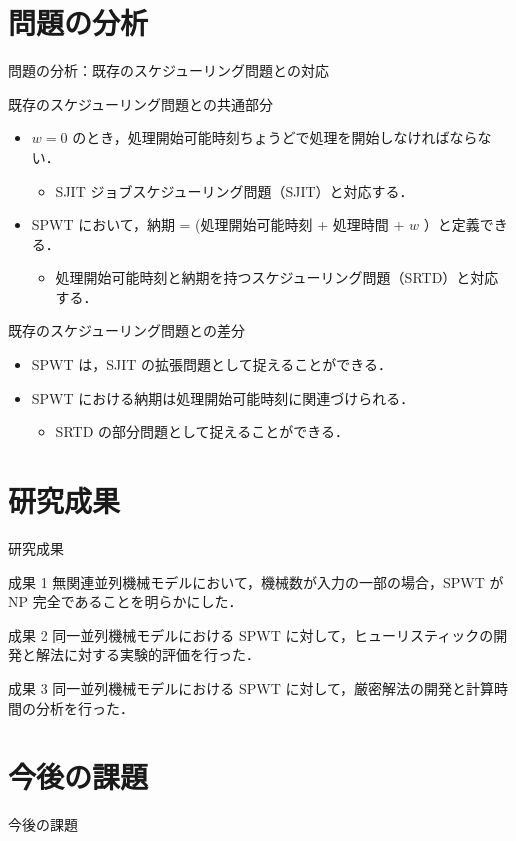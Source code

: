 \documentclass[dvipdfmx]{beamer}
\begin{document}
\section{問題の分析}
\begin{frame}{問題の分析：既存のスケジューリング問題との対応}
  \begin{block}{既存のスケジューリング問題との共通部分}
    \begin{itemize}
      \item {$w = 0$ のとき，処理開始可能時刻ちょうどで処理を開始しなければならない．}
      \begin{itemize}
        \item {\alert{SJIT ジョブスケジューリング問題（SJIT）}と対応する．}
      \end{itemize}
      \item {SPWT において，納期 = (処理開始可能時刻 + 処理時間 + $w$ ）と定義できる．}
      \begin{itemize}
        \item {\alert{処理開始可能時刻と納期を持つスケジューリング問題（SRTD）}と対応する．}
      \end{itemize}
    \end{itemize}
  \end{block}
  \begin{block}{既存のスケジューリング問題との差分}
    \begin{itemize}
      \item {SPWT は，SJIT の\alert{拡張問題}として捉えることができる．}
      \item {SPWT における納期は処理開始可能時刻に関連づけられる．}
      \begin{itemize}
        \item {SRTD の\alert{部分問題}として捉えることができる．}
      \end{itemize}
    \end{itemize}
  \end{block}
\end{frame}
\section{研究成果}
\begin{frame}{研究成果}
  \begin{block}{成果 1}
    無関連並列機械モデルにおいて，機械数が入力の一部の場合，SPWT が NP 完全であることを明らかにした．
  \end{block}
  \begin{block}{成果 2}
    同一並列機械モデルにおける SPWT に対して，ヒューリスティックの開発と解法に対する実験的評価を行った．
  \end{block}
  \begin{block}{成果 3}
    同一並列機械モデルにおける SPWT に対して，厳密解法の開発と計算時間の分析を行った．
  \end{block}
\end{frame}
\section{今後の課題}
\begin{frame}{今後の課題}

\end{frame}
\end{document}
